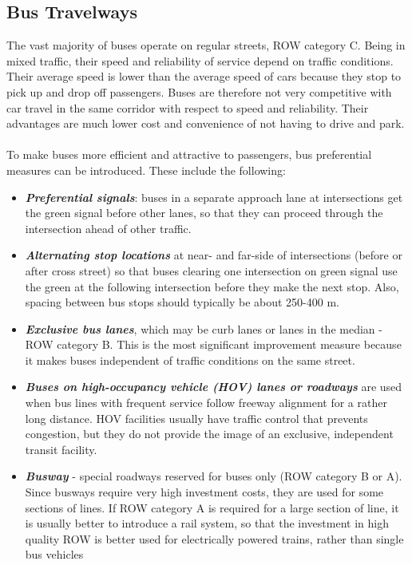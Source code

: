 \subsection{Bus Travelways}
The vast majority of buses operate on regular streets, ROW category C. Being in mixed traffic, their speed and reliability of service depend on traffic conditions. Their average speed is lower than the average speed of cars because they stop to pick up and drop off passengers. Buses are therefore not very competitive with car travel in the same corridor with respect to speed and reliability. Their advantages are much lower cost and convenience of not having to drive and park.\\\\
To make buses more efficient and attractive to passengers, bus preferential measures can be introduced. These include the following:
\begin{itemize}
	\item \textbf{\textit{Preferential signals}}: buses in a separate approach lane at intersections get the green signal before other lanes, so that they can proceed through the intersection ahead of other traffic.
	\item \textbf{\textit{Alternating stop locations}} at near- and far-side of intersections (before or after cross street) so that buses clearing one intersection on green signal use the green at the following intersection before they make the next stop. Also, spacing between bus stops should typically be about 250-400 m.
	\item \textbf{\textit{Exclusive bus lanes}}, which may be curb lanes or lanes in the median - ROW category B. This is the most significant improvement measure because it makes buses independent of traffic conditions on the same street.
	\item \textbf{\textit{Buses on high-occupancy vehicle (HOV) lanes or roadways}} are used when bus lines with frequent service follow freeway alignment for a rather long distance. HOV facilities usually have traffic control that prevents congestion, but they do not provide the image of an exclusive, independent transit facility.
	\item \textbf{\textit{Busway}} - special roadways reserved for buses only (ROW category B or A). Since busways require very high investment costs, they are used for some sections of lines. If ROW category A is required for a large section of line, it is usually better to introduce a rail system, so that the investment in high quality ROW is better used for electrically powered trains, rather than single bus vehicles
\end{itemize}

